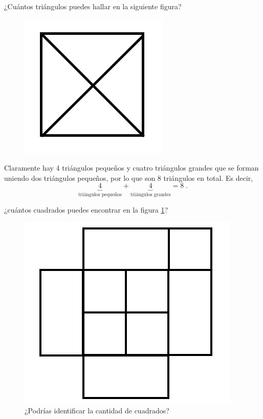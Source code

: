 \begin{ejemplo}
¿Cuántos triángulos puedes hallar en la siguiente figura?
\begin{figure}[h]
    \centering
    \includegraphics[scale=0.5]{Imagenes/IMG1/square.png}
\end{figure}
\end{ejemplo}
\begin{solucion}
Claramente hay 4 triángulos pequeños y cuatro triángulos grandes que se forman uniendo dos triángulos pequeños, por lo que son 8 triángulos en total. Es decir,
\[\underbrace{4}_{\text{triángulos pequeños}}+\underbrace{4}_{\text{triángulos grandes}}=8\;.\]
\end{solucion}

\begin{ejemplo}
¿cuántos cuadrados puedes encontrar en la figura \ref{cuadrado}?
\begin{figure}[h]
    \centering
    \includegraphics[scale=0.5]{Imagenes/IMG1/fig.png}
    \caption{¿Podrías identificar la cantidad de cuadrados?}
    \label{cuadrado}
\end{figure}
\end{ejemplo}

